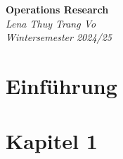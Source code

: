 \documentclass[a4paper, 10pt]{article}
\begin{document}
\begin{titlepage}
    \centering
    \vspace*{3cm}
    {\Huge \textbf{Operations Research}}\\[1.5cm]
    {\large \textit{Lena Thuy Trang Vo}}\\[0.5cm]
    {\large \textit{Wintersemester 2024/25}}\\[2cm]

    \vfill
\end{titlepage}

\tableofcontents
\newpage

\section{Einführung}


\section{Kapitel 1}
\end{document}
